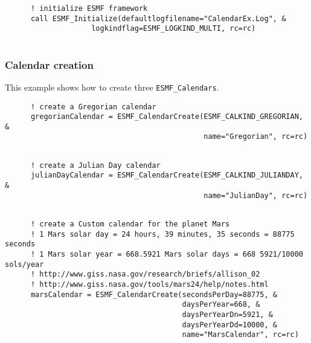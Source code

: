
 \begin{verbatim}
      ! initialize ESMF framework
      call ESMF_Initialize(defaultlogfilename="CalendarEx.Log", &
                    logkindflag=ESMF_LOGKIND_MULTI, rc=rc)
 
\end{verbatim}
 

  \subsubsection{Calendar creation}
 
   This example shows how to create three {\tt ESMF\_Calendars}. 

 \begin{verbatim}
      ! create a Gregorian calendar
      gregorianCalendar = ESMF_CalendarCreate(ESMF_CALKIND_GREGORIAN, &
                                              name="Gregorian", rc=rc)
 
\end{verbatim}
 

 \begin{verbatim}
      ! create a Julian Day calendar
      julianDayCalendar = ESMF_CalendarCreate(ESMF_CALKIND_JULIANDAY, &
                                              name="JulianDay", rc=rc)
 
\end{verbatim}
 

 \begin{verbatim}
      ! create a Custom calendar for the planet Mars
      ! 1 Mars solar day = 24 hours, 39 minutes, 35 seconds = 88775 seconds
      ! 1 Mars solar year = 668.5921 Mars solar days = 668 5921/10000 sols/year
      ! http://www.giss.nasa.gov/research/briefs/allison_02
      ! http://www.giss.nasa.gov/tools/mars24/help/notes.html
      marsCalendar = ESMF_CalendarCreate(secondsPerDay=88775, &
                                         daysPerYear=668, &
                                         daysPerYearDn=5921, &
                                         daysPerYearDd=10000, &
                                         name="MarsCalendar", rc=rc)
 
\end{verbatim}
 
